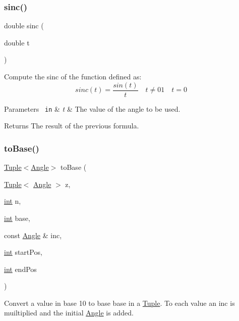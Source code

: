 \subsubsection{\texorpdfstring{sinc()}{sinc()}}
{\footnotesize\ttfamily double sinc (\begin{DoxyParamCaption}\item[{double}]{t }\end{DoxyParamCaption})\hspace{0.3cm}{\ttfamily [inline]}}

Compute the sinc of the function defined as\+: \[ sinc(t)=\frac{sin(t)}{t}\quad t\neq 0 1\quad t=0 \] 
\begin{DoxyParams}[1]{Parameters}
\mbox{\texttt{ in}}  & {\em t} & The value of the angle to be used. \\
\hline
\end{DoxyParams}
\begin{DoxyReturn}{Returns}
The result of the previous formula. 
\end{DoxyReturn}
\mbox{\label{dubins_8hh_a24a357b93081a0180dfec16136bc8ff7}} 
\subsubsection{\texorpdfstring{toBase()}{toBase()}}
{\footnotesize\ttfamily \mbox{\hyperlink{class_tuple}{Tuple}}$<$\mbox{\hyperlink{class_angle}{Angle}}$>$ to\+Base (\begin{DoxyParamCaption}\item[{\mbox{\hyperlink{class_tuple}{Tuple}}$<$ \mbox{\hyperlink{class_angle}{Angle}} $>$}]{z,  }\item[{\mbox{\hyperlink{draw_8hh_aa620a13339ac3a1177c86edc549fda9b}{int}}}]{n,  }\item[{\mbox{\hyperlink{draw_8hh_aa620a13339ac3a1177c86edc549fda9b}{int}}}]{base,  }\item[{const \mbox{\hyperlink{class_angle}{Angle}} \&}]{inc,  }\item[{\mbox{\hyperlink{draw_8hh_aa620a13339ac3a1177c86edc549fda9b}{int}}}]{start\+Pos,  }\item[{\mbox{\hyperlink{draw_8hh_aa620a13339ac3a1177c86edc549fda9b}{int}}}]{end\+Pos }\end{DoxyParamCaption})}



Convert a value in base 10 to base {\ttfamily base} in a {\ttfamily \mbox{\hyperlink{class_tuple}{Tuple}}}. To each value an inc is muiltiplied and the initial {\ttfamily \mbox{\hyperlink{class_angle}{Angle}}} is added. 


